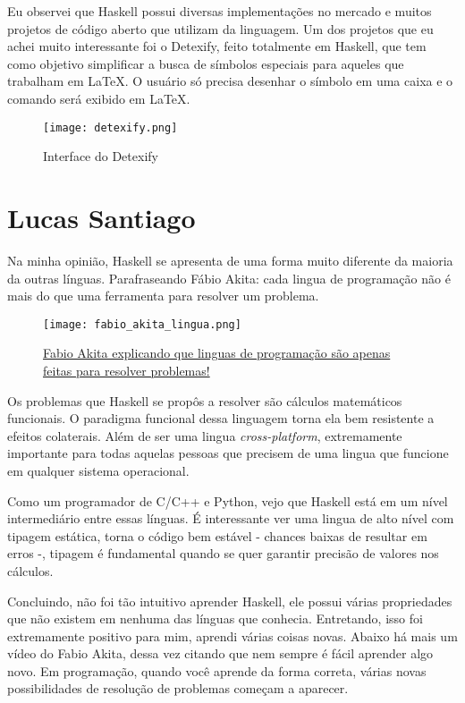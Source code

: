 \begin{apendicesenv}
    Eu observei que Haskell possui diversas implementações no mercado e muitos projetos de código aberto que utilizam da linguagem.
    Um dos projetos que eu achei muito interessante foi o Detexify, feito totalmente em Haskell, que tem como objetivo simplificar a 
    busca de símbolos especiais para aqueles que trabalham em \LaTeX. O usuário só precisa desenhar o símbolo em uma caixa e
    o comando será exibido em \LaTeX.
    
    \begin{figure}[ht]
      \centering
      \texttt{[image: detexify.png]}
      \caption{Interface do Detexify}
    \end{figure}

    \newpage 

    \chapter{Lucas Santiago}

    Na minha opinião, Haskell se apresenta de uma forma muito diferente da maioria da outras línguas. 
    Parafraseando Fábio Akita: cada lingua de programação não é mais do que uma ferramenta
    para resolver um problema.

    \begin{figure}[ht]
      \texttt{[image: fabio\_akita\_lingua.png]}
      \caption{\href{https://www.youtube.com/watch?v=p9-WuJbVHHc}{Fabio Akita explicando que linguas de programação são apenas feitas para resolver problemas!}}
    \end{figure}

    Os problemas que Haskell se propôs a resolver são cálculos matemáticos
    funcionais. O paradigma funcional dessa linguagem torna ela bem resistente a efeitos colaterais. Além de ser uma lingua
    \emph{cross-platform}, extremamente importante para todas aquelas pessoas que precisem de uma lingua que funcione
    em qualquer sistema operacional. 

    Como um programador de C/C++ e Python, vejo que Haskell está em um nível intermediário entre essas línguas.
    É interessante ver uma lingua de alto nível com tipagem estática, torna o código bem estável - chances baixas de 
    resultar em erros -, tipagem é fundamental quando se quer garantir precisão de valores nos cálculos.

    Concluindo, não foi tão intuitivo aprender Haskell, ele possui várias propriedades que não existem em nenhuma das línguas
    que conhecia. Entretando, isso foi extremamente positivo para mim, aprendi várias coisas novas. Abaixo há
    mais um vídeo do Fabio Akita, dessa vez citando que nem sempre é fácil aprender algo novo. Em programação,
    quando você aprende da forma correta, várias novas possibilidades de resolução de problemas começam a aparecer.


\end{apendicesenv}
